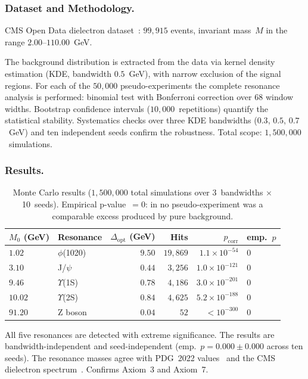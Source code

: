 \documentclass[12pt]{iopart}
\begin{document}
	\subsubsection{Dataset and Methodology.}
	CMS Open Data dielectron dataset~\cite{cms_opendata}:
	$99{,}915$ events, invariant mass~$M$ in the range
	$2.00$--$110.00$~GeV.
	
	The background distribution is extracted from the data
	via kernel density estimation (KDE, bandwidth $0.5$~GeV),
	with narrow exclusion of the signal regions.
	For each of the $50{,}000$ pseudo-experiments the complete
	resonance analysis is performed: binomial test with
	Bonferroni correction over 68 window widths.
	Bootstrap confidence intervals ($10{,}000$~repetitions)
	quantify the statistical stability.
	Systematics checks over three KDE bandwidths
	($0.3$, $0.5$, $0.7$~GeV) and ten independent
	seeds confirm the robustness.
	Total scope: $1{,}500{,}000$~simulations.
	
	\subsubsection{Results.}
	
	\begin{table}[ht]
		\centering
		\caption{Monte Carlo results
			($1{,}500{,}000$ total simulations over
			3~bandwidths $\times$ 10~seeds).
			Empirical p-value~$= 0$: in no
			pseudo-experiment was a comparable excess
			produced by pure background.}
		\label{tab:mc_results}
		\begin{tabular}{llrrrl}
			\hline
			$M_0$ (GeV) & Resonance
			& $\Delta_{\mathrm{opt}}$ (GeV)
			& Hits & $p_{\mathrm{corr}}$
			& emp.\ $p$ \\
			\hline
			$1.02$ & $\phi$(1020) & $9.50$
			& $19{,}869$ & $1.1 \times 10^{-54}$
			& $0$ \\
			$3.10$ & J/$\psi$ & $0.44$
			& $3{,}256$ & $1.0 \times 10^{-121}$
			& $0$ \\
			$9.46$ & $\Upsilon$(1S) & $0.78$
			& $4{,}186$ & $3.0 \times 10^{-201}$
			& $0$ \\
			$10.02$ & $\Upsilon$(2S) & $0.84$
			& $4{,}625$ & $5.2 \times 10^{-188}$
			& $0$ \\
			$91.20$ & Z boson & $0.04$
			& $52$ & $< 10^{-300}$
			& $0$ \\
			\hline
		\end{tabular}
	\end{table}
	
	All five resonances are detected with extreme significance.
	The results are bandwidth-independent and seed-independent
	(emp.\ $p = 0.000 \pm 0.000$ across ten seeds).
	The resonance masses agree with PDG~2022 values~\cite{pdg2022}
	and the CMS dielectron spectrum~\cite{cms_dielectron}.
	Confirms Axiom~3 and Axiom~7.
	
\end{document}
